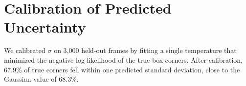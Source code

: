 \chapter{Calibration of Predicted Uncertainty}
\label{app:a}

We calibrated $\sigma$ on 3,000 held-out frames by fitting a single temperature that minimized
the negative log-likelihood of the true box corners. After calibration, 67.9\% of true corners
fell within one predicted standard deviation, close to the Gaussian value of 68.3\%.
